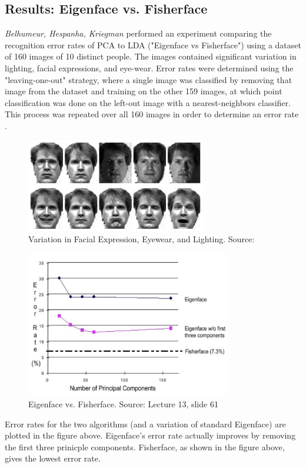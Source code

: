 \documentclass{article}
\begin{document}
\subsection{Results: Eigenface vs. Fisherface}
\textit{Belhumeur, Hespanha, Kriegman} performed an experiment comparing the recognition error rates of PCA to LDA ("Eigenface vs Fisherface") using a dataset of 160 images of 10 distinct people. The images contained significant variation in lighting, facial expressions, and eye-wear. Error rates were determined using the "leaving-one-out" strategy, where a single image was classified by removing that image from the dataset and training on the other 159 images, at which point classification was done on the left-out image with a nearest-neighbors classifier. This process was repeated over all 160 images in order to determine an error rate \cite{EigenfacesvsFisherfaces}.

\begin{figure}[H]
  \centering
  \includegraphics[width=0.7\textwidth]{variation_in_expression}
  \caption{Variation in Facial Expression, Eyewear, and Lighting. Source: \cite{EigenfacesvsFisherfaces}}
\end{figure}

\begin{figure}[H]
  \centering
  \includegraphics[width=0.8\textwidth]{error_rate}
  \caption{Eigenface vs. Fisherface. Source: Lecture 13, slide 61}
\end{figure}

Error rates for the two algorithms (and a variation of standard Eigenface) are plotted in the figure above. Eigenface's error rate actually improves by removing the first three prinicple components. Fisherface, as shown in the figure above, gives the lowest error rate.


\small


\end{document}
